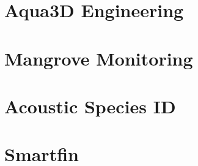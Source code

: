 \section{Aqua3D Engineering}

\section{Mangrove Monitoring}

\section{Acoustic Species ID}

\section{Smartfin}

